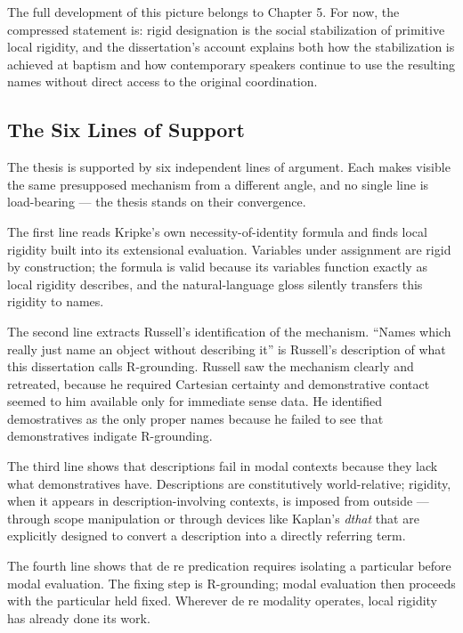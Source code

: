 \documentclass[12pt,a4paper]{article}
\begin{document}
The full development of this picture belongs to Chapter 5. For now, the compressed statement is: rigid designation is the social stabilization of primitive local rigidity, and the dissertation's account explains both how the stabilization is achieved at baptism and how contemporary speakers continue to use the resulting names without direct access to the original coordination.

\subsection{The Six Lines of Support}\label{the-six-lines-of-support}

The thesis is supported by six independent lines of argument. Each makes visible the same presupposed mechanism from a different angle, and no single line is load-bearing --- the thesis stands on their convergence.

The first line reads Kripke's own necessity-of-identity formula and finds local rigidity built into its extensional evaluation. Variables under assignment are rigid by construction; the formula is valid because its variables function exactly as local rigidity describes, and the natural-language gloss silently transfers this rigidity to names.

The second line extracts Russell's identification of the mechanism. ``Names which really just name an object without describing it'' is Russell's description of what this dissertation calls R-grounding. Russell saw the mechanism clearly and retreated, because he required Cartesian certainty and demonstrative contact seemed to him available only for immediate sense data. He identified demostratives as the only proper names because he failed to see that demonstratives indigate R-grounding.

The third line shows that descriptions fail in modal contexts because they lack what demonstratives have. Descriptions are constitutively world-relative; rigidity, when it appears in description-involving contexts, is imposed from outside --- through scope manipulation or through devices like Kaplan's \emph{dthat} that are explicitly designed to convert a description into a directly referring term.

The fourth line shows that de re predication requires isolating a particular before modal evaluation. The fixing step is R-grounding; modal evaluation then proceeds with the particular held fixed. Wherever de re modality operates, local rigidity has already done its work.
\end{document}
